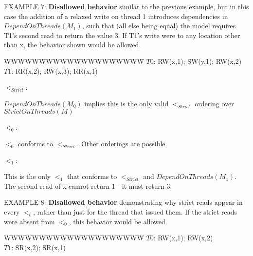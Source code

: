 \documentclass[12pt,titlepage]{article}
\newcounter{parnum}
\newcommand\np{\addtocounter{parnum}{1}\hspace{-2em}\makebox[2em][l]{\arabic{parnum}}}
\begin{document}
\bigskip
\np EXAMPLE 7: \textbf{Disallowed behavior} 
similar to the previous example, but in this case
the addition of a relaxed write on thread 1 introduces dependencies in 
$DependOnThreads(M_1)$, such that (all else being equal) the model requires T1's second read
to return the value 3. If T1's write were to any location other than x, 
the behavior shown would be allowed.
\begin{tabbing}WWWWW\=WWWWW\=WWWWW\=WWWWW\=\kill
$T0$: \> RW(x,1); \> SW(y,1); \> RW(x,2)\\
$T1$: \> RR(x,2); \> RW(x,3); \> RR(x,1)\\
\end{tabbing}

\bigskip
$<_{Strict}$:\hspace{0.1in}
\hspace{0.1in}
\parbox[t]{2.5in}
{$DependOnThreads(M_0)$ implies this is the only valid $<_{Strict}$ ordering
over $StrictOnThreads(M)$}

\bigskip
$<_0$:\hspace{0.1in}
\hspace{0.25in}
\parbox[t]{2.5in}
{$<_0$ conforms to $<_{Strict}$. Other orderings are possible.}

\bigskip
$<_1$:\hspace{0.1in}
\hspace{0.25in}
\parbox[t]{2.5in}
{This is the only $<_1$ that conforms to $<_{Strict}$ and $DependOnThreads(M_1)$.
The second read of x cannot return 1 - it must return 3.}

\bigskip
\np EXAMPLE 8: \textbf{Disallowed behavior} 
demonstrating why strict reads appear in every $<_t$,
rather than just for the thread that issued them. If the strict reads were 
absent from $<_0$, this behavior would be allowed.

\begin{tabbing}WWWWW\=WWWWW\=WWWWW\=WWWWW\=\kill
$T0$: \> RW(x,1); \> RW(x,2)\\
$T1$: \> SR(x,2); \> SR(x,1)\\
\end{tabbing}
\end{document}
